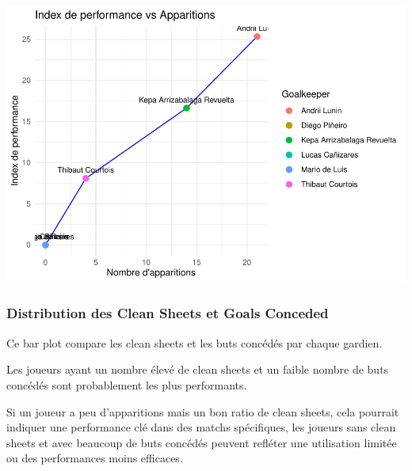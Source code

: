 \documentclass[
  6pt,
]{article}
\begin{document}
\includegraphics[width=0.8\linewidth]{Analyse_Impact_Performances_Joueurs_files/figure-latex/IndexPer vs Appar Gardiern-1}

\subsubsection{Distribution des Clean Sheets et Goals
Conceded}\label{distribution-des-clean-sheets-et-goals-conceded}

Ce bar plot compare les clean sheets et les buts concédés par chaque
gardien.

Les joueurs ayant un nombre élevé de clean sheets et un faible nombre de
buts concédés sont probablement les plus performants.

Si un joueur a peu d'apparitions mais un bon ratio de clean sheets, cela
pourrait indiquer une performance clé dans des matchs spécifiques, les
joueurs sans clean sheets et avec beaucoup de buts concédés peuvent
refléter une utilisation limitée ou des performances moins efficaces.
\end{document}
